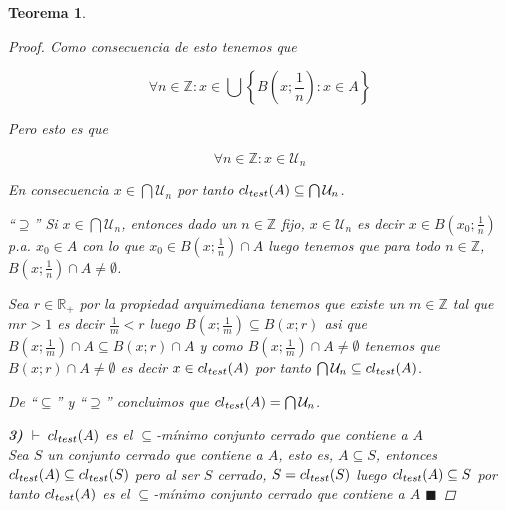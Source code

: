 \documentclass[oneside]{book} %
\theoremstyle{Teorema}
\newtheorem{Teorema}[Definicion]{Teorema}
\theoremstyle{Ejemplos}
\theoremstyle{[Obs]}
\def \test {test}
\newcommand{\cerradura}[2][\test]{\ifx \test #1 {\overline{#2}} \else {cl_{#1}(#2)} \fi} %
\renewcommand{\{}{\left\lbrace} %
\renewcommand{\}}{\right\rbrace} %
\newcommand{\n}{\cap} %
\newcommand{\U}{\bigcup} %
\newcommand{\N}{\bigcap} %
\renewcommand{\sc}{\subseteq} %
\newcommand{\Sc}{\supseteq} %
\newcommand{\R}{\mathbb{R}} %
\newcommand{\Z}{\mathbb{Z}} %
\renewcommand{\qed}{$\blacksquare$} %
\newcommand{\pd}{$\vdash\ $} %
\begin{document}
\begin{Teorema}
\begin{proof}
					Como consecuencia de esto tenemos que 

					\[ \forall n \in \Z : x \in \U\{ B(x;\textstyle\frac{1}{n}) : x \in A \} \]

					Pero esto es que
					
					\[ \forall n \in \Z : x \in \mathcal{U}_{n} \]

					En consecuencia $x \in \N \mathcal{U}_{n}$ por tanto $\cerradura{A} \sc \N \mathcal{U}_{n}$.

					``$\Sc$'' Si $x \in \N \mathcal{U}_{n}$, entonces dado un $n \in \Z$ fijo, $x \in \mathcal{U}_{n}$ es decir $x \in B(x_0;\frac{1}{n})$ p.a. $x_0 \in A$ con lo que $x_0 \in B(x;\frac{1}{n}) \n A$ luego tenemos que para todo $n \in \Z$, $B(x;\frac{1}{n}) \n A \neq \emptyset$.

					Sea $r \in \R_{+}$ por la propiedad arquimediana tenemos que existe un $m \in \Z$ tal que $mr > 1$ es decir $\frac{1}{m} < r$ luego $B(x;\frac{1}{m}) \sc B(x;r)$ asi que $B(x;\frac{1}{m}) \n A \sc B(x;r) \n A$ y como $B(x;\frac{1}{m}) \n A \neq \emptyset$ tenemos que $B(x;r) \n A \neq \emptyset$ es decir $x \in \cerradura{A}$ por tanto $\N \mathcal{U}_{n} \sc \cerradura{A}$.
 
					De ``$\sc$'' y ``$\Sc$'' concluimos que $\cerradura{A} = \N \mathcal{U}_n$.

					\textbf{3)} \pd $\cerradura{A}$ es el $\sc$-mínimo conjunto cerrado que contiene a $A$ \\ 
					Sea $S$ un conjunto cerrado que contiene a $A$, esto es, $A \sc S$, entonces $\cerradura{A} \sc \cerradura{S}$ pero al ser $S$ cerrado, $S = \cerradura{S}$ luego $\cerradura{A} \sc S$ por tanto $\cerradura{A}$ es el $\sc$-mínimo conjunto cerrado que contiene a $A$ \qed

				\end{proof}
			
			\end{Teorema}
\end{document}
